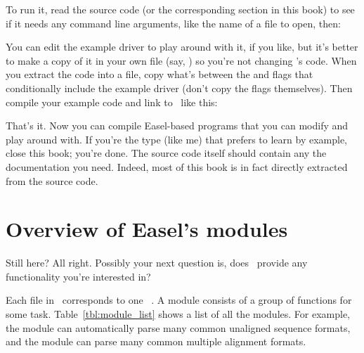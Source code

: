 To run it, read the source code (or the corresponding section in this
book) to see if it needs any command line arguments, like the name of
a file to open, then:

\begin{cchunk}
\end{cchunk}

You can edit the example driver to play around with it, if you like,
but it's better to make a copy of it in your own file (say,
) so you're not changing \Easel's code. When you
extract the code into a file, copy what's between the  and  flags that
conditionally include the example driver (don't copy the flags
themselves). Then compile your example code and link to \Easel\ like
this:

\begin{cchunk}
\end{cchunk}

That's it. Now you can compile Easel-based programs that you can
modify and play around with. If you're the type (like me) that prefers
to learn by example, close this book; you're done. The source code
itself should contain any the documentation you need. Indeed, most of
this book is in fact directly extracted from the source code.

\section{Overview of Easel's modules}

Still here? All right. Possibly your next question is, does \Easel\ 
provide any functionality you're interested in?

Each  file in \Easel\ corresponds to one \Easel\ 
.  A module consists of a group of functions for some
task. Table~\ref{tbl:module_list} shows a list of all the modules. For
example, the \eslmod{sqio} module can automatically parse many common
unaligned sequence formats, and the \eslmod{msa} module can parse many
common multiple alignment formats.

